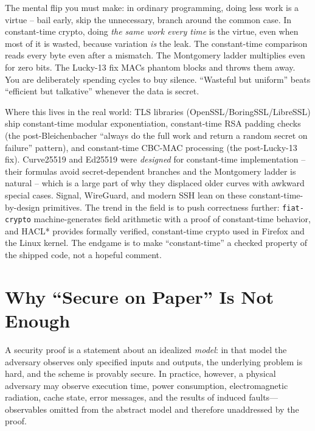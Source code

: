\begin{intuitionbox}
The mental flip you must make: in ordinary programming, doing less work is a virtue -- bail early, skip the unnecessary, branch around the common case. In constant-time crypto, doing \emph{the same work every time} is the virtue, even when most of it is wasted, because variation \emph{is} the leak. The constant-time comparison reads every byte even after a mismatch. The Montgomery ladder multiplies even for zero bits. The Lucky-13 fix MACs phantom blocks and throws them away. You are deliberately spending cycles to buy silence. ``Wasteful but uniform'' beats ``efficient but talkative'' whenever the data is secret.
\end{intuitionbox}

\begin{applicationbox}
Where this lives in the real world: TLS libraries (OpenSSL/BoringSSL/LibreSSL) ship constant-time modular exponentiation, constant-time RSA padding checks (the post-Bleichenbacher ``always do the full work and return a random secret on failure'' pattern), and constant-time CBC-MAC processing (the post-Lucky-13 fix). Curve25519 and Ed25519 were \emph{designed} for constant-time implementation -- their formulas avoid secret-dependent branches and the Montgomery ladder is natural -- which is a large part of why they displaced older curves with awkward special cases. Signal, WireGuard, and modern SSH lean on these constant-time-by-design primitives. The trend in the field is to push correctness further: \texttt{fiat-crypto} machine-generates field arithmetic with a proof of constant-time behavior, and HACL* provides formally verified, constant-time crypto used in Firefox and the Linux kernel. The endgame is to make ``constant-time'' a checked property of the shipped code, not a hopeful comment.
\end{applicationbox}

\section{Why ``Secure on Paper'' Is Not Enough}
\label{ch37:paper}

A security proof is a statement about an idealized \emph{model}: in that model the adversary observes only specified inputs and outputs, the underlying problem is hard, and the scheme is provably secure. In practice, however, a physical adversary may observe execution time, power consumption, electromagnetic radiation, cache state, error messages, and the results of induced faults---observables omitted from the abstract model and therefore unaddressed by the proof.

